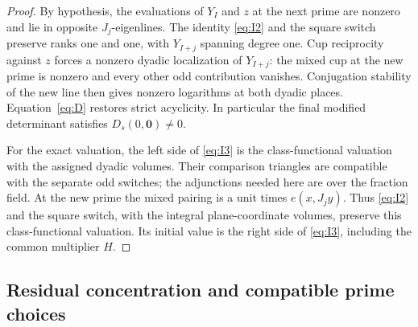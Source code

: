 \begin{proof}
By hypothesis, the evaluations of \(Y_I\) and \(z\) at the next prime
are nonzero and lie in opposite \(J_j\)-eigenlines. The identity
\eqref{eq:I2} and the square switch preserve ranks one and one, with
\(Y_{I+j}\) spanning degree one. Cup reciprocity against \(z\) forces a
nonzero dyadic localization of \(Y_{I+j}\): the mixed cup at the new prime
is nonzero and every other odd contribution vanishes. Conjugation stability
of the new line then gives nonzero logarithms at both dyadic places.
Equation~\eqref{eq:D} restores strict acyclicity. In particular the final
modified determinant satisfies \(D_s(0,\mathbf0)\ne0\).

For the exact valuation, the left side of \eqref{eq:I3} is the
class-functional valuation with the assigned dyadic volumes. Their
comparison triangles are compatible with the separate odd switches;
the adjunctions needed here are over the fraction field. At the new prime
the mixed pairing is a unit times \(e(x,J_jy)\). Thus \eqref{eq:I2} and
the square switch, with the integral plane-coordinate volumes, preserve
this class-functional valuation. Its initial value is the right side
of \eqref{eq:I3}, including the common multiplier \(H\).
\end{proof}

\subsection{Residual concentration and compatible prime choices}

